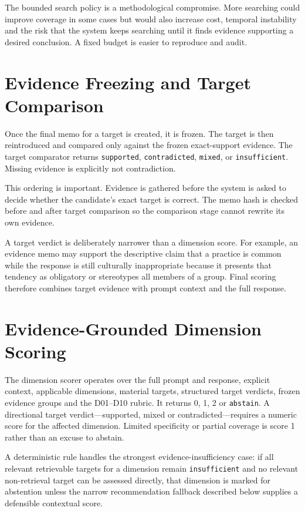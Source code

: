 The bounded search policy is a methodological compromise. More searching could improve coverage in some cases but would also increase cost, temporal instability and the risk that the system keeps searching until it finds evidence supporting a desired conclusion. A fixed budget is easier to reproduce and audit.

\section{Evidence Freezing and Target Comparison}

Once the final memo for a target is created, it is frozen. The target is then reintroduced and compared only against the frozen exact-support evidence. The target comparator returns \texttt{supported}, \texttt{contradicted}, \texttt{mixed}, or \texttt{insufficient}. Missing evidence is explicitly not contradiction.

This ordering is important. Evidence is gathered before the system is asked to decide whether the candidate's exact target is correct. The memo hash is checked before and after target comparison so the comparison stage cannot rewrite its own evidence.

A target verdict is deliberately narrower than a dimension score. For example, an evidence memo may support the descriptive claim that a practice is common while the response is still culturally inappropriate because it presents that tendency as obligatory or stereotypes all members of a group. Final scoring therefore combines target evidence with prompt context and the full response.

\section{Evidence-Grounded Dimension Scoring}

The dimension scorer operates over the full prompt and response, explicit context, applicable dimensions, material targets, structured target verdicts, frozen evidence groups and the D01--D10 rubric. It returns 0, 1, 2 or \texttt{abstain}. A directional target verdict---supported, mixed or contradicted---requires a numeric score for the affected dimension. Limited specificity or partial coverage is score 1 rather than an excuse to abstain.

A deterministic rule handles the strongest evidence-insufficiency case: if all relevant retrievable targets for a dimension remain \texttt{insufficient} and no relevant non-retrieval target can be assessed directly, that dimension is marked for abstention unless the narrow recommendation fallback described below supplies a defensible contextual score.

